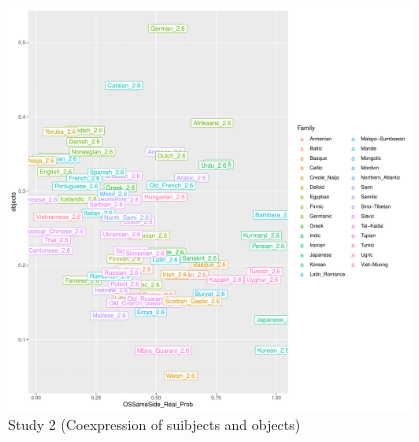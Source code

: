\documentclass[11pt,a4paper]{article}
\begin{document}

\begin{figure}
    \centering
    \includegraphics[width=0.95\textwidth]{figures/objects-order-pureud-byVerb.pdf}
    \caption{Study 2 (Coexpression of suibjects and objects)}
    \label{fig:study2}
\end{figure}









\end{document}
